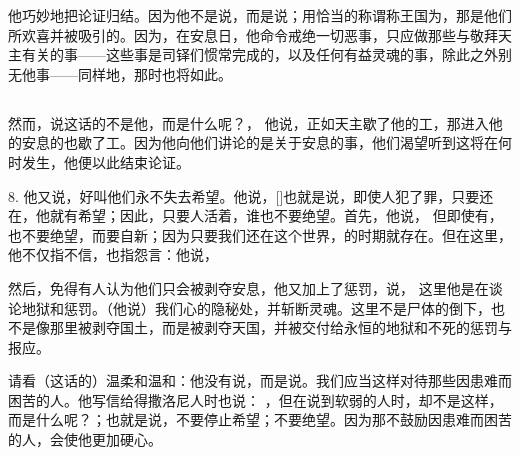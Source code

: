 他巧妙地把论证归结。因为他不是说，而是说；用恰当的称谓称王国为，那是他们所欢喜并被吸引的。因为，在安息日，他命令戒绝一切恶事，只应做那些与敬拜天主有关的事——这些事是司铎们惯常完成的，以及任何有益灵魂的事，除此之外别无他事——同样地，那时也将如此。\par


\subsection{}

然而，说这话的不是他，而是什么呢？， 他说，正如天主歇了他的工，那进入他的安息的也歇了工。因为他向他们讲论的是关于安息的事，他们渴望听到这将在何时发生，他便以此结束论证。\par

8. 他又说，好叫他们永不失去希望。他说，[]也就是说，即使人犯了罪，只要还在，他就有希望；因此，只要人活着，谁也不要绝望。首先，他说，  但即使有，也不要绝望，而要自新；因为只要我们还在这个世界，的时期就存在。但在这里，他不仅指不信，也指怨言：他说，\par

然后，免得有人认为他们只会被剥夺安息，他又加上了惩罚，说， 这里他是在谈论地狱和惩罚。（他说）我们心的隐秘处，并斩断灵魂。这里不是尸体的倒下，也不是像那里被剥夺国土，而是被剥夺天国，并被交付给永恒的地狱和不死的惩罚与报应。\par

  请看（这话的）温柔和温和：他没有说，而是说。我们应当这样对待那些因患难而困苦的人。他写信给得撒洛尼人时也说： ，但在说到软弱的人时，却不是这样，而是什么呢？；也就是说，不要停止希望；不要绝望。因为那不鼓励因患难而困苦的人，会使他更加硬心。\par

